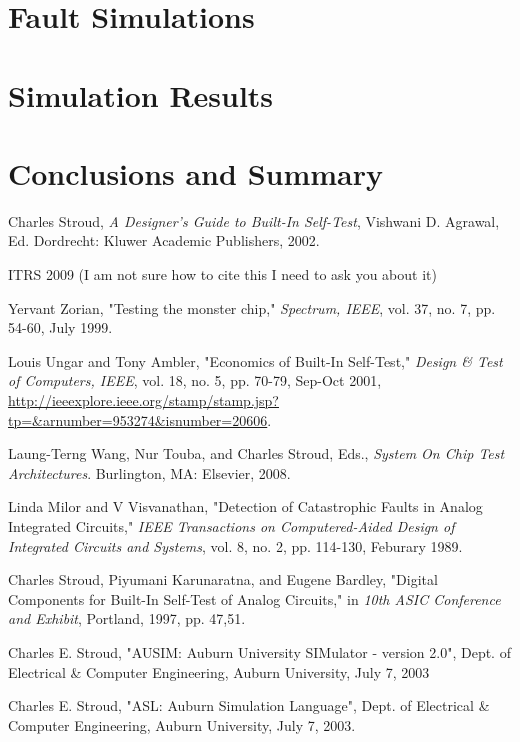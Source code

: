 \documentclass[12pt]{report}
\begin{document}
\chapter{Fault Simulations}

\chapter{Simulation Results}

\chapter{Conclusions and Summary}

\begin{thebibliography}{99}
 Charles Stroud, {\em A Designer's Guide to Built-In Self-Test}, Vishwani D. Agrawal, Ed. Dordrecht: Kluwer Academic Publishers, 2002.

 ITRS 2009 (I am not sure how to cite this I need to ask you about it)

 Yervant Zorian, "Testing the monster chip," {\em Spectrum, IEEE}, vol. 37, no. 7, pp. 54-60, July 1999.

 Louis Ungar and Tony Ambler, "Economics of Built-In Self-Test," {\em Design \& Test of Computers, IEEE}, vol. 18, no. 5, pp. 70-79, Sep-Oct 2001, \url{http://ieeexplore.ieee.org/stamp/stamp.jsp?tp=&arnumber=953274&isnumber=20606}.

 Laung-Terng Wang, Nur Touba, and Charles Stroud, Eds., {\em System On Chip Test Architectures}. Burlington, MA: Elsevier, 2008.

 Linda Milor and V Visvanathan, "Detection of Catastrophic Faults in Analog Integrated Circuits," {\em IEEE Transactions on Computered-Aided Design of Integrated Circuits and Systems}, vol. 8, no. 2, pp. 114-130, Feburary 1989.

 Charles Stroud, Piyumani Karunaratna, and Eugene Bardley, "Digital Components for Built-In Self-Test of Analog Circuits," in {\em 10th ASIC Conference and Exhibit}, Portland, 1997, pp. 47,51.

  Charles E. Stroud, "AUSIM: Auburn University SIMulator - version 2.0", Dept. of Electrical \& 
Computer Engineering, Auburn University, July 7, 2003

 Charles E. Stroud, "ASL: Auburn Simulation Language", Dept. of Electrical \& Computer
Engineering, Auburn University, July 7, 2003.


\end{thebibliography}
\end{document}
